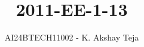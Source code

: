 \documentclass[journal,9pt,onecolumn]{IEEEtran}
\begin{document}

\vspace{3cm}
\title{2011-EE-1-13}
\author{AI24BTECH11002 - K. Akshay Teja}
\maketitle
 \bigskip
{\let\newpage\relax\maketitle}

\renewcommand{\thefigure}{\theenumi}
\renewcommand{\thetable}{\theenumi}
\setlength{\intextsep}{10pt} %

\renewcommand{\thetable}{\theenumi}
\end{document}
